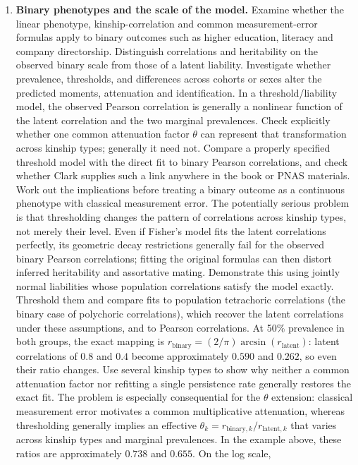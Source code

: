 \documentclass[12pt]{article}
\renewenvironment{itemize}{\begin{enumerate}}{\end{enumerate}}
\begin{document}
\begin{itemize}
\item \textbf{Binary phenotypes and the scale of the model.}
Examine whether the linear phenotype, kinship-correlation and common
measurement-error formulas apply to binary outcomes such as higher
education, literacy and company directorship. Distinguish correlations
and heritability on the observed binary scale from those of a latent
liability. Investigate whether prevalence, thresholds, and differences
across cohorts or sexes alter the predicted moments, attenuation and
identification. In a threshold/liability model, the observed Pearson
correlation is generally a nonlinear function of the latent correlation
and the two marginal prevalences. Check explicitly whether one common
attenuation factor $\theta$ can represent that transformation across
kinship types; generally it need not. Compare a properly specified
threshold model with the direct fit to binary Pearson correlations, and
check whether Clark supplies such a link anywhere in the book or PNAS
materials. Work out the implications before treating a binary outcome
as a continuous phenotype with classical measurement error.
The potentially serious problem is that thresholding changes the pattern
of correlations across kinship types, not merely their level. Even if
Fisher's model fits the latent correlations perfectly, its geometric
decay restrictions generally fail for the observed binary Pearson
correlations; fitting the original formulas can then distort inferred
heritability and assortative mating. Demonstrate this using jointly
normal liabilities whose population correlations satisfy the model
exactly. Threshold them and compare fits to population tetrachoric
correlations (the binary case of polychoric correlations), which recover
the latent correlations under these assumptions, and to Pearson
correlations. At 50\% prevalence in both groups, the exact mapping is
$r_{\mathrm{binary}}=(2/\pi)\arcsin(r_{\mathrm{latent}})$: latent correlations
of $0.8$ and $0.4$ become approximately $0.590$ and $0.262$, so even their
ratio changes. Use several kinship types to show why neither a common
attenuation factor nor refitting a single persistence rate generally
restores the exact fit. The problem is especially consequential for the
$\theta$ extension: classical measurement error motivates a common
multiplicative attenuation, whereas thresholding generally implies an
effective $\theta_k=r_{\mathrm{binary},k}/r_{\mathrm{latent},k}$ that varies
across kinship types and marginal prevalences. In the example above,
these ratios are approximately $0.738$ and $0.655$. On the log scale,

\end{itemize}
\end{document}
